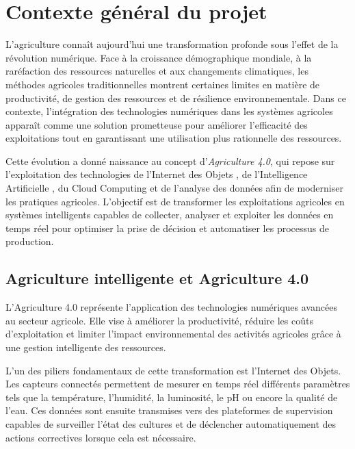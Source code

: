 \section{Contexte général du projet}

L’agriculture connaît aujourd’hui une transformation profonde sous l’effet de la révolution numérique. Face à la croissance démographique mondiale, à la raréfaction des ressources naturelles et aux changements climatiques, les méthodes agricoles traditionnelles montrent certaines limites en matière de productivité, de gestion des ressources et de résilience environnementale. Dans ce contexte, l’intégration des technologies numériques dans les systèmes agricoles apparaît comme une solution prometteuse pour améliorer l’efficacité des exploitations tout en garantissant une utilisation plus rationnelle des ressources.

Cette évolution a donné naissance au concept d’\textit{Agriculture 4.0}, qui repose sur l’exploitation des technologies de l’Internet des Objets , de l’Intelligence Artificielle , du Cloud Computing et de l’analyse des données afin de moderniser les pratiques agricoles. L’objectif est de transformer les exploitations agricoles en systèmes intelligents capables de collecter, analyser et exploiter les données en temps réel pour optimiser la prise de décision et automatiser les processus de production.

\subsection{Agriculture intelligente et Agriculture 4.0}

L’Agriculture 4.0 représente l’application des technologies numériques avancées au secteur agricole. Elle vise à améliorer la productivité, réduire les coûts d’exploitation et limiter l’impact environnemental des activités agricoles grâce à une gestion intelligente des ressources.

L’un des piliers fondamentaux de cette transformation est l’Internet des Objets. Les capteurs connectés permettent de mesurer en temps réel différents paramètres tels que la température, l’humidité, la luminosité, le pH ou encore la qualité de l’eau. Ces données sont ensuite transmises vers des plateformes de supervision capables de surveiller l’état des cultures et de déclencher automatiquement des actions correctives lorsque cela est nécessaire.

